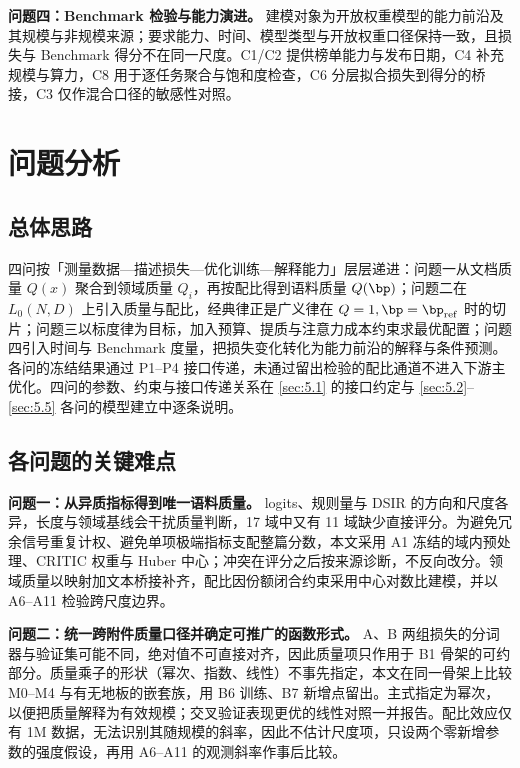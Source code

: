 \textbf{问题四：Benchmark 检验与能力演进。} 建模对象为开放权重模型的能力前沿及其规模与非规模来源；要求能力、时间、模型类型与开放权重口径保持一致，且损失与 Benchmark 得分不在同一尺度。C1/C2 提供榜单能力与发布日期，C4 补充规模与算力，C8 用于逐任务聚合与饱和度检查，C6 分层拟合损失到得分的桥接，C3 仅作混合口径的敏感性对照。

\section{问题分析}
\label{sec:2}

\subsection{总体思路}
\label{sec:2.1}

四问按「测量数据—描述损失—优化训练—解释能力」层层递进：问题一从文档质量 $Q(x)$ 聚合到领域质量 $Q_i$，再按配比得到语料质量 $Q(\bp)$；问题二在 $L_0(N,D)$ 上引入质量与配比，经典律正是广义律在 $Q=1,\bp=\bp_{\rm ref}$ 时的切片；问题三以标度律为目标，加入预算、提质与注意力成本约束求最优配置；问题四引入时间与 Benchmark 度量，把损失变化转化为能力前沿的解释与条件预测。各问的冻结结果通过 P1–P4 接口传递，未通过留出检验的配比通道不进入下游主优化。四问的参数、约束与接口传递关系在 \ref{sec:5.1} 的接口约定与 \ref{sec:5.2}–\ref{sec:5.5} 各问的模型建立中逐条说明。

\subsection{各问题的关键难点}
\label{sec:2.2}

\textbf{问题一：从异质指标得到唯一语料质量。} logits、规则量与 DSIR 的方向和尺度各异，长度与领域基线会干扰质量判断，17 域中又有 11 域缺少直接评分。为避免冗余信号重复计权、避免单项极端指标支配整篇分数，本文采用 A1 冻结的域内预处理、CRITIC 权重与 Huber 中心；冲突在评分之后按来源诊断，不反向改分。领域质量以映射加文本桥接补齐，配比因份额闭合约束采用中心对数比建模，并以 A6–A11 检验跨尺度边界。

\textbf{问题二：统一跨附件质量口径并确定可推广的函数形式。} A、B 两组损失的分词器与验证集可能不同，绝对值不可直接对齐，因此质量项只作用于 B1 骨架的可约部分。质量乘子的形状（幂次、指数、线性）不事先指定，本文在同一骨架上比较 M0–M4 与有无地板的嵌套族，用 B6 训练、B7 新增点留出。主式指定为幂次，以便把质量解释为有效规模；交叉验证表现更优的线性对照一并报告。配比效应仅有 1M 数据，无法识别其随规模的斜率，因此不估计尺度项，只设两个零新增参数的强度假设，再用 A6–A11 的观测斜率作事后比较。

